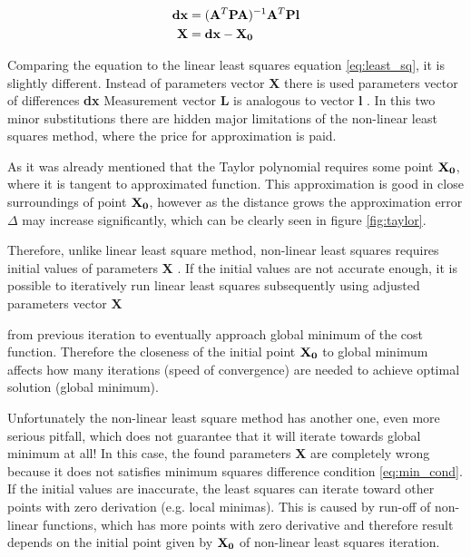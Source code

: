 \documentclass[a4paper,12pt]{article}
\newcommand{\ematr}[1]{
{\bf #1}
}
\newcommand{\evect}[1]{
{\bf #1}
}
\begin{document}
\begin{equation}
\begin{split}
\label{eq:non_least_sq}
\evect{dx} &= (\ematr{A}^{T} \ematr{P} \ematr{A})^{-1} \ematr{A}^{T} \ematr{P} \ematr{l} \\
\evect{X} &=  {\evect{dx} -  \evect{X_{0}}} \\
\end{split}
\end{equation}


Comparing the equation to the linear least squares equation \eqref{eq:least_sq},
 it is slightly different. Instead of parameters vector \evect{X} there is used 
parameters vector of differences \evect{dx} Measurement vector \evect{L} is analogous to vector \evect{l}. In this two minor 
substitutions there are hidden major limitations of the non-linear least squares method, 
where the price for approximation is paid. 

As it was already mentioned that the Taylor polynomial requires some point $\evect{X_{0}}$, where it is tangent to 
approximated function.
This approximation is good in close surroundings of point $\evect{X_{0}}$, however as the distance 
grows the approximation error $\Delta$ may increase significantly, which can be clearly seen in figure \ref{fig:taylor}.

Therefore, unlike linear least square method, non-linear least squares requires initial 
values of parameters \evect{X}. If the initial values are not accurate 
enough, it is possible to iteratively run linear least squares subsequently using adjusted parameters vector \evect{X}
from previous iteration to eventually approach global minimum of the cost function. 
Therefore the closeness of the initial point $\evect{X_{0}}$ to global minimum affects how many iterations (speed of convergence)
are needed to achieve optimal solution (global minimum).

Unfortunately the non-linear least square method has another one, even more serious pitfall, which 
does not guarantee that it will iterate towards global minimum at all!
In this case, the found parameters \evect{X} are completely wrong because 
it does not satisfies minimum squares difference condition \eqref{eq:min_cond}. If the initial values are 
inaccurate, the least squares can iterate toward other points with zero derivation (e.g. local minimas).  
This is caused by run-off of non-linear functions, which has more points with zero derivative
and therefore result depends on the initial point given by $\evect{X_{0}}$  of non-linear least squares iteration.
\end{document}
